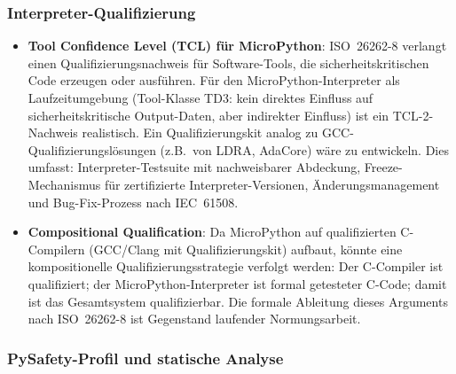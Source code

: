 ﻿\documentclass[12pt,a4paper,twoside]{article}
\begin{document}
\subsubsection{Interpreter-Qualifizierung}

\begin{itemize}
  \item \textbf{Tool Confidence Level (TCL) für MicroPython}:
        ISO~26262-8 verlangt einen Qualifizierungsnachweis für Software-Tools,
        die sicherheitskritischen Code erzeugen oder ausführen.
        Für den MicroPython-Interpreter als Laufzeitumgebung
        (Tool-Klasse TD3: kein direktes Einfluss auf sicherheitskritische
        Output-Daten, aber indirekter Einfluss) ist ein TCL-2-Nachweis
        realistisch.
        Ein Qualifizierungskit analog zu GCC-Qualifizierungslösungen (z.B.\ von
        LDRA, AdaCore) wäre zu entwickeln.
        Dies umfasst: Interpreter-Testsuite mit nachweisbarer Abdeckung,
        Freeze-Mechanismus für zertifizierte Interpreter-Versionen,
        Änderungsmanagement und Bug-Fix-Prozess nach IEC~61508.

  \item \textbf{Compositional Qualification}:
        Da MicroPython auf qualifizierten C-Compilern (GCC/Clang mit
        Qualifizierungskit) aufbaut, könnte eine kompositionelle
        Qualifizierungsstrategie verfolgt werden: Der C-Compiler ist
        qualifiziert; der MicroPython-Interpreter ist formal
        getesteter C-Code; damit ist das Gesamtsystem qualifizierbar.
        Die formale Ableitung dieses Arguments nach ISO~26262-8 ist
        Gegenstand laufender Normungsarbeit.
\end{itemize}

\subsubsection{PySafety-Profil und statische Analyse}
\end{document}
